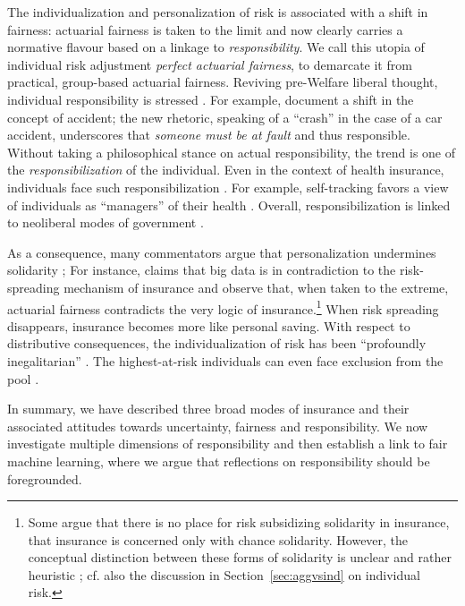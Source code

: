 \documentclass[11pt]{article} %
\makeatletter
\newcommand*{\cf}{cf.\@\xspace}
\makeatother
\begin{document}
The individualization and personalization of risk is associated with a shift in fairness: actuarial fairness is taken to the limit and now clearly carries a normative flavour based on a linkage to  \textit{responsibility}. We call this utopia of individual risk adjustment \textit{perfect actuarial fairness}, to demarcate it from practical, group-based actuarial fairness. Reviving pre-Welfare liberal thought, individual responsibility is stressed \citep{dean1998risk}. For example, \citet{ericson2000moral} document a shift in the concept of accident; the new rhetoric, speaking of a ``crash'' in the case of a car accident, underscores that \textit{someone must be at fault} and thus responsible. Without taking a philosophical stance on actual responsibility, the trend is one of the \textit{responsibilization} of the individual. Even in the context of health insurance, individuals face such responsibilization \citep{van2006making,prainsack2020shifting}. For example, self-tracking favors a view of individuals as ``managers'' of their health \citep{lupton2016diverse,sharon2017self}. Overall, responsibilization is linked to neoliberal modes of government \citep{dean1998risk,ericson2000moral,meyers2018enacting}.

As a consequence, many commentators argue that personalization undermines solidarity \citep{Rosanvallon2000-ROSTNS-2,prainsack2020shifting,barry2020insurance,cevolini2020pool}; For instance, \citet{swedloff2014risk} claims that big data is in contradiction to the risk-spreading mechanism of insurance and \citet{martinez2016fair} observe that, when taken to the extreme, actuarial fairness contradicts the very logic of insurance.\footnote{Some argue that there is no place for risk subsidizing solidarity in insurance, that insurance is concerned only with chance solidarity. However, the conceptual distinction between these forms of solidarity is unclear and rather heuristic \citep{frezal2020fairness}; \cf also the discussion in Section~\ref{sec:aggvsind} on individual risk.} When risk spreading disappears, insurance becomes more like personal saving. With respect to distributive consequences, the individualization of risk has been ``profoundly inegalitarian'' \citep{armstrong2005equality}. The highest-at-risk individuals can even face exclusion from the pool \citep{lehtonen2015producing,cevolini2020pool}.

In summary, we have described three broad modes of insurance and their associated attitudes towards uncertainty, fairness and responsibility. We now investigate multiple dimensions of responsibility and then establish a link to fair machine learning, where we argue that reflections on responsibility should be foregrounded.
\end{document}
